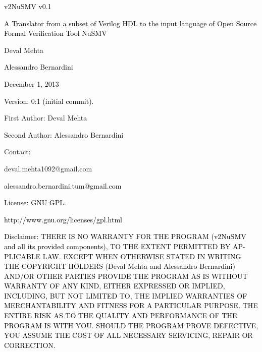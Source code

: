 \documentclass[a4paper]{article}
\title{}
\author{Akshat Mehendale}
\date{2013-12-05T01:26:00Z}
\begin{document}
\clearpage\clearpage\pagestyle{MP}
{\centering\color[rgb]{0.0,0.0,0.039215688}
\textcolor{black}{v2NuSMV v0.1}
\par}

{\centering\color[rgb]{0.0,0.0,0.039215688}
\textcolor{black}{A Translator from a subset of Verilog HDL to the input
language of Open Source Formal Verification Tool NuSMV}
\par}


\bigskip

{\color[rgb]{0.0,0.0,0.039215688}
Deval Mehta}

{\color[rgb]{0.0,0.0,0.039215688}
\textcolor{black}{Alessandro Bernardini}}


\bigskip

{\color[rgb]{0.0,0.0,0.039215688}
\textcolor{black}{December 1}\textcolor{black}{, 2013}}


\bigskip


\bigskip

{\color[rgb]{0.0,0.0,0.039215688}
\textcolor{black}{Version: 0:1 (initial commit).}}


\bigskip

{\color{black}
First Author: Deval Mehta \ }

{\color[rgb]{0.0,0.0,0.039215688}
\textcolor{black}{Second Author: Alessandro Bernardini}}


\bigskip

{\color{black}
Contact:\ }

{\color{black}
deval.mehta1092@gmail.com}

{\color[rgb]{0.0,0.0,0.039215688}
\textcolor{black}{alessandro.bernardini.tum@gmail.com}}


\bigskip

{\color[rgb]{0.0,0.0,0.039215688}
\textcolor{black}{License: GNU GPL.}}


\bigskip

{\color[rgb]{0.0,0.0,0.039215688}
\textcolor{black}{http://www.gnu.org/licenses/gpl.html}}


\bigskip

{\color[rgb]{0.0,0.0,0.039215688}
\textcolor{black}{Disclaimer: THERE IS NO WARRANTY FOR THE PROGRAM
(v2NuSMV and all its provided components), TO THE EXTENT PERMITTED BY
AP-PLICABLE LAW. EXCEPT WHEN OTHERWISE STATED IN WRITING THE COPYRIGHT
HOLDERS (Deval Mehta and Alessandro Bernardini) AND/OR OTHER PARTIES
PROVIDE THE PROGRAM AS IS WITHOUT WARRANTY OF ANY KIND, EITHER
EXPRESSED OR IMPLIED, INCLUDING, BUT NOT LIMITED TO, THE IMPLIED
WARRANTIES OF MERCHANTABILITY AND FITNESS FOR A PARTICULAR PURPOSE. THE
ENTIRE RISK AS TO THE QUALITY AND PERFORMANCE OF THE PROGRAM IS WITH
YOU. SHOULD THE PROGRAM PROVE DEFECTIVE, YOU ASSUME THE COST OF ALL
NECESSARY SERVICING, REPAIR OR CORRECTION.}}
\end{document}
